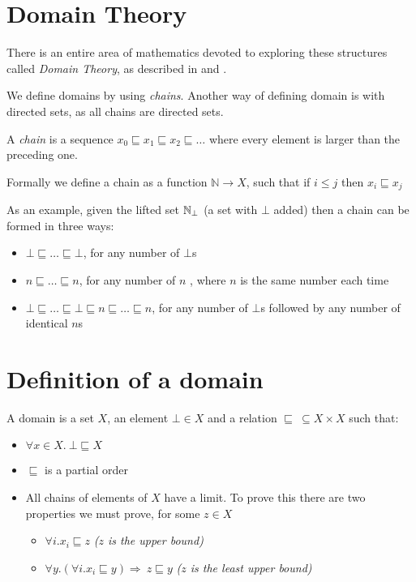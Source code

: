 \section{Domain Theory}
There is an entire area of mathematics devoted to exploring these structures called \emph{Domain Theory}, as described in \citep{Gunter92} and  \citep{Hutton14}.

We define domains by using \emph{chains}. Another way of defining domain is with directed sets, as all chains are directed sets.

A \emph{chain} is a sequence $x_0 \sqsubseteq x_1 \sqsubseteq x_2 \sqsubseteq \dots $ where every element is larger than the preceding one.

Formally we define a chain as a function $\mathbb{N} \to X$, such that if $i \leq j$ then $x_i \sqsubseteq x_j$

As an example, given the lifted set  $\mathbb{N}_{\bot}$ (a set with $\bot$ added) then a chain can be formed in three ways:

\begin{itemize}
\item{$\bot \sqsubseteq \dots \sqsubseteq \bot$, for any number of $\bot$s}
\item{$n \sqsubseteq \dots \sqsubseteq n$, for any number of $n$ , where $n$ is the same number each time}
\item{$\bot \sqsubseteq \dots \sqsubseteq \bot \sqsubseteq n \sqsubseteq \dots \sqsubseteq n$, for any number of $\bot$s followed by any number of identical $n$s}
\end{itemize} 

\section{Definition of a domain}
A domain is a set $X$, an element $\bot \in X$ and a relation $\sqsubseteq \ \subseteq X \times X$ such that:

\begin{itemize}
\item{$\forall x \in X. \ \bot \sqsubseteq X$}
\item{$\sqsubseteq$ is a partial order}
\item{All chains of elements of $X$ have a limit. To prove this there are two properties we must prove, for some $z \in X$}
\begin{itemize}
 \item{$\forall i. x_i \sqsubseteq z$ \hspace{1cm} \emph{($z$ is the upper bound)}}
 \item{$\forall y. (\forall i.x_i  \sqsubseteq y) \Rightarrow \ z \sqsubseteq y$ \hspace{0.25cm} \emph{($z$ is the least upper bound)}}
\end{itemize}
\end{itemize}

